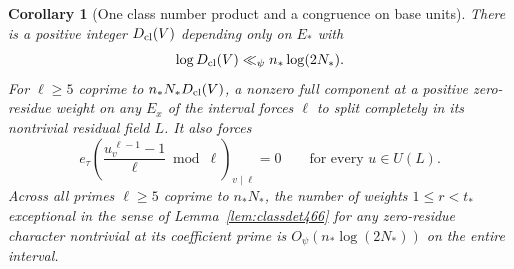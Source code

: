 \documentclass[a4paper,11pt]{article}
\newtheorem{corollary}[proposition]{Corollary}
\theoremstyle{definition}
\theoremstyle{remark}
\numberwithin{equation}{section}
\begin{document}
\begin{corollary}[One class number product and a congruence on base units]\leavevmode
\label{cor:zeromass506}
There is a positive integer \(D_{\rm cl}(V)\) depending only on \(E_*\)
with
\[
                   \log D_{\rm cl}(V)\ll_\psi n_*\log(2N_*).
\]
For \(\ell\ge5\) coprime to \(n_*N_*D_{\rm cl}(V)\), a nonzero full
component at a positive zero-residue weight on any \(E_x\) of
the interval forces \(\ell\) to split completely in its
nontrivial residual field \(L\). It also forces
\[
   e_\tau\left(\frac{u_v^{\,\ell-1}-1}{\ell}\bmod\ell
                                   \right)_{v\mid\ell}=0
                         \qquad\text{for every }u\in U(L).
\]
Across \emph{all} primes \(\ell\ge5\) coprime to \(n_*N_*\), the
number of weights \(1\le r<t_*\) exceptional in the sense of
Lemma~\ref{lem:classdet466} for any zero-residue character
nontrivial at its coefficient prime is
\(O_\psi(n_*\log(2N_*))\) on the entire interval.
\end{corollary}
\end{document}
